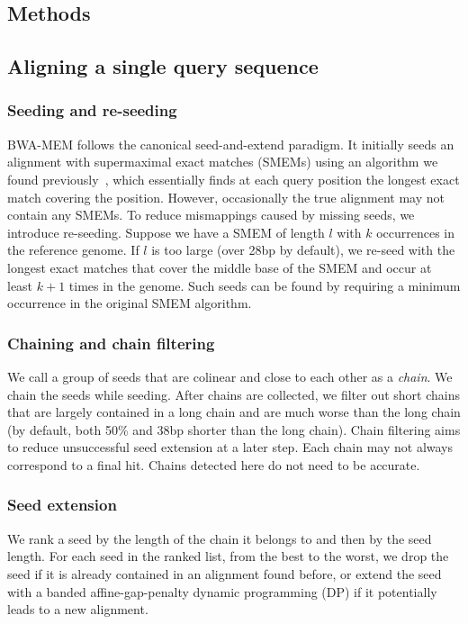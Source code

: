 \documentclass{bioinfo}
\begin{document}
\begin{methods}

\section{Methods}

\subsection{Aligning a single query sequence}

\subsubsection{Seeding and re-seeding} BWA-MEM follows the canonical
seed-and-extend paradigm. It initially seeds an alignment with supermaximal
exact matches (SMEMs) using an algorithm we found previously~\citep[Algorithm
5]{Li:2012fk}, which essentially finds at each query position the longest exact
match covering the position. However, occasionally the true alignment may not
contain any SMEMs.  To reduce mismappings caused by missing seeds, we introduce
re-seeding. Suppose we have a SMEM of length $l$ with $k$ occurrences in the
reference genome. If $l$ is too large (over 28bp by default), we re-seed
with the longest exact matches that cover the middle base of the SMEM and occur
at least $k+1$ times in the genome. Such seeds can be found by requiring a
minimum occurrence in the original SMEM algorithm.

\subsubsection{Chaining and chain filtering} We call a group of seeds that are
colinear and close to each other as a \emph{chain}. We chain the seeds while
seeding. After chains are collected, we filter out short chains that are
largely contained in a long chain and are much worse than the long chain (by
default, both 50\% and 38bp shorter than the long chain). Chain filtering aims
to reduce unsuccessful seed extension at a later step. Each chain may not
always correspond to a final hit. Chains detected here do not need to be
accurate.

\subsubsection{Seed extension} We rank a seed by the length of the chain it
belongs to and then by the seed length. For each seed in the ranked list, from
the best to the worst, we drop the seed if it is already contained in an
alignment found before, or extend the seed with a banded affine-gap-penalty
dynamic programming (DP) if it potentially leads to a new alignment.


\end{methods}
\end{document}
